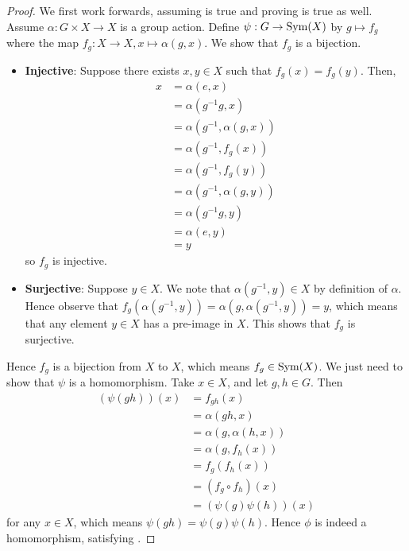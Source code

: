 \begin{proof}
    We first work forwards, assuming  is true and proving  is true as well. Assume $\alpha: G \times X \to X$ is a group action. Define $\psi: G \to \mathrm{Sym}(X)$ by $g \mapsto f_g$ where the map $f_g: X \to X, x \mapsto \alpha(g, x)$. We show that $f_g$ is a bijection.
    \begin{itemize}
        \item \textbf{Injective}: Suppose there exists $x, y \in X$ such that $f_g(x) = f_g(y)$. Then,
        \begin{align*}
            x &= \alpha(e, x)\\
            &= \alpha(g^{-1}g, x)\\
            &= \alpha(g^{-1}, \alpha(g, x))\\
            &= \alpha(g^{-1}, f_g(x))\\
            &= \alpha(g^{-1}, f_g(y))\\
            &= \alpha(g^{-1}, \alpha(g, y))\\
            &= \alpha(g^{-1}g, y)\\
            &= \alpha(e, y)\\
            &= y
        \end{align*}
        so $f_g$ is injective.

        \item \textbf{Surjective}: Suppose $y \in X$. We note that $\alpha(g^{-1}, y) \in X$ by definition of $\alpha$. Hence observe that $f_g(\alpha(g^{-1}, y)) = \alpha(g, \alpha(g^{-1}, y)) = y$, which means that any element $y \in X$ has a pre-image in $X$. This shows that $f_g$ is surjective.
    \end{itemize}

    Hence $f_g$ is a bijection from $X$ to $X$, which means $f_g \in \mathrm{Sym}(X)$. We just need to show that $\psi$ is a homomorphism. Take $x \in X$, and let $g, h \in G$. Then
    \begin{align*}
        (\psi(gh))(x) &= f_{gh}(x)\\
        &= \alpha(gh, x)\\
        &= \alpha(g, \alpha(h, x))\\
        &= \alpha(g, f_h(x))\\
        &= f_g(f_h(x))\\
        &= (f_g \circ f_h)(x)\\
        &= (\psi(g)\psi(h))(x)
    \end{align*}
    for any $x \in X$, which means $\psi(gh) = \psi(g)\psi(h)$. Hence $\phi$ is indeed a homomorphism, satisfying .


\end{proof}
